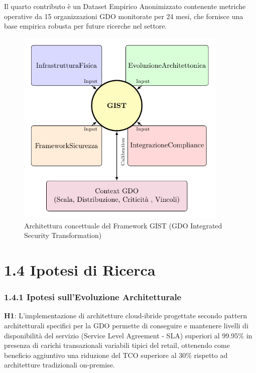 \documentclass{report}
\begin{document}
Il quarto contributo è un Dataset Empirico Anonimizzato contenente
metriche operative da 15 organizzazioni GDO monitorate per 24 mesi, che
fornisce una base empirica robusta per future ricerche nel settore.

\begin{figure}[htbp]
    \centering
    \includegraphics[width=0.9\textwidth]{figura 1-2}
    \caption{Architettura concettuale del Framework GIST (GDO Integrated Security Transformation)}
    \label{fig:gist_framework}
\end{figure}

\section{\texorpdfstring{\textbf{1.4 Ipotesi di
Ricerca}}{1.4 Ipotesi di Ricerca}}\label{ipotesi-di-ricerca}

\subsubsection{\texorpdfstring{\textbf{1.4.1 Ipotesi sull'Evoluzione
Architetturale}}{1.4.1 Ipotesi sull'Evoluzione Architetturale}}\label{ipotesi-sullevoluzione-architetturale}

\textbf{H1}: L'implementazione di architetture cloud-ibride progettate
secondo pattern architetturali specifici per la GDO permette di
conseguire e mantenere livelli di disponibilità del servizio (Service
Level Agreement - SLA) superiori al 99.95\% in presenza di carichi
transazionali variabili tipici del retail, ottenendo come beneficio
aggiuntivo una riduzione del TCO superiore al 30\% rispetto ad
architetture tradizionali on-premise.
\end{document}
